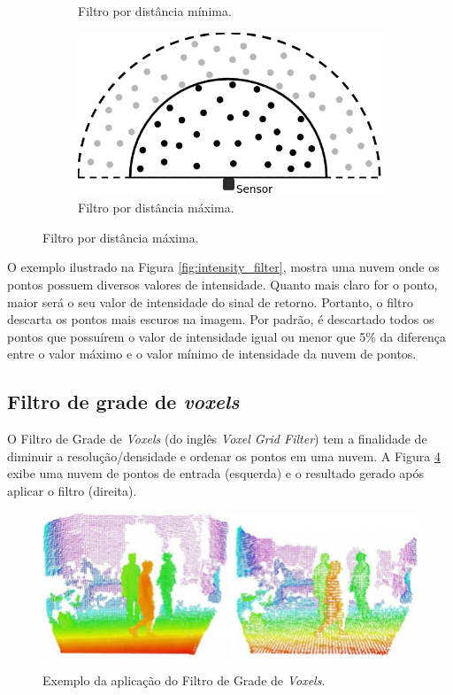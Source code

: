 \begin{figure}[H]
\begin{subfigure}[t]{0.4\textwidth}
        \caption{Filtro por distância mínima.}
        \label{fig:distance_filter}
    \end{subfigure}
    \hspace{3em}
    \begin{subfigure}[t]{0.4\textwidth}
        \includegraphics[width=\textwidth]{dados/figuras/distance_filter2.png}
        \caption{Filtro por distância máxima.}
        \label{fig:distance_filter2}
    \end{subfigure}
\end{figure}

O exemplo ilustrado na Figura \ref{fig:intensity_filter}, mostra uma nuvem onde os pontos possuem diversos valores de intensidade. 
Quanto mais claro for o ponto, maior será o seu valor de intensidade do sinal de retorno. 
Portanto, o filtro descarta os pontos mais escuros na imagem.
Por padrão, é descartado todos os pontos que possuírem o valor de intensidade igual ou menor que 5\% da diferença entre o valor máximo e o valor mínimo de intensidade da nuvem de pontos.

\subsection{Filtro de grade de \textit{voxels}}
\label{sec:voxelgrid_filter}

O Filtro de Grade de \textit{Voxels} (do inglês \textit{Voxel Grid Filter}) tem a finalidade de diminuir a resolução/densidade e ordenar os pontos em uma nuvem. 
A Figura \ref{fig:voxelgrid_filter} exibe uma nuvem de pontos de entrada (esquerda) e o resultado gerado após aplicar o filtro (direita).

\begin{figure}[H]
    \centering
    \caption{Exemplo da aplicação do Filtro de Grade de \textit{Voxels}.}
    \includegraphics[scale=0.4]{dados/figuras/voxelgrid_filter.png}
    \label{fig:voxelgrid_filter}
\end{figure}

